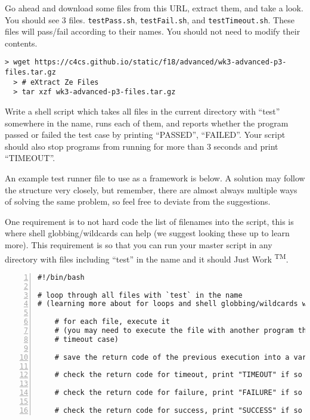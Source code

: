 \documentclass{article}
\begin{document}
\noindent
Go ahead and download some files from this URL, extract them, and take a look.
You should see 3 files. \texttt{testPass.sh}, \texttt{testFail.sh}, and
\texttt{testTimeout.sh}. These files will pass/fail according to their names.
You should not need to modify their contents.

\begin{Verbatim}[fontsize=\footnotesize]
  > wget https://c4cs.github.io/static/f18/advanced/wk3-advanced-p3-files.tar.gz
  > # eXtract Ze Files
  > tar xzf wk3-advanced-p3-files.tar.gz
\end{Verbatim}

\noindent
Write a shell script which takes all files in the current directory with
``test'' somewhere in the name, runs each of them, and reports whether the
program passed or failed the test case by printing ``PASSED'', ``FAILED''. Your
script should also stop programs from running for more than 3 seconds and
print ``TIMEOUT''.

An example test runner file to use as a framework is below. A solution may follow the
structure very closely, but remember, there are almost always multiple ways of
solving the same problem, so feel free to deviate from the suggestions.

One requirement is to not hard code the list of filenames into the script, this
is where shell globbing/wildcards can help (we suggest looking these up to learn
more). This requirement is so that you can run your master script in any
directory with files including ``test'' in the name and it should
Just Work \textsuperscript{TM}.


\begin{minipage}[t]{0.5\textwidth}
\begin{lstlisting}[numbers=left]
#!/bin/bash

# loop through all files with `test` in the name
# (learning more about for loops and shell globbing/wildcards will help for this)

    # for each file, execute it
    # (you may need to execute the file with another program that will handle the
    # timeout case)

    # save the return code of the previous execution into a variable

    # check the return code for timeout, print "TIMEOUT" if so

    # check the return code for failure, print "FAILURE" if so

    # check the return code for success, print "SUCCESS" if so

\end{lstlisting}
\end{minipage}
\end{document}
